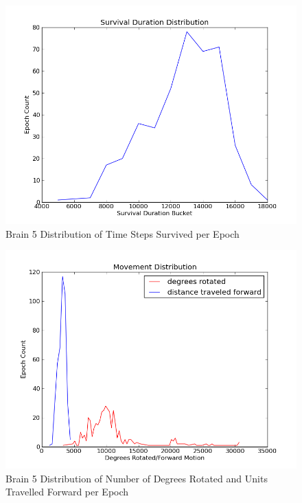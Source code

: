 \documentclass[a4paper,11pt]{article}
\begin{document}
\begin{figure}
\begin{center}
  \includegraphics[scale=1.0]{img/brain5/survivalGauss-3872.22.png}
  \caption{Brain 5 Distribution of Time Steps Survived per Epoch}
  \label{fig:b5survive}
\end{center}
\end{figure}

\begin{figure}
\begin{center}
  \includegraphics[scale=1.0]{img/brain5/travelGauss-r7664.03-d1032.80.png}
  \caption{Brain 5 Distribution of Number of Degrees Rotated and Units Travelled Forward per Epoch}
  \label{fig:b5travel}
\end{center}
\end{figure}
\end{document}
